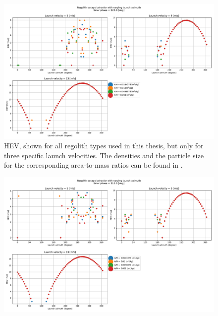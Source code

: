 \documentclass[print]{tudelft-report}
\begin{document}
\begin{appendices}
\begin{figure}[htb]
    \label{fig:longestEdge_allParticles_escape_hev_solarPhase135}
    \end{figure}
    \FloatBarrier
    \begin{figure}[htb]
    \centering
    \captionsetup{justification=centering}
    \includegraphics[width=\textwidth, height=0.5\textheight, keepaspectratio=true]{Results/Images/longest_edge_perturbations/multiple_regolith_types/phase225_escapeHEV.pdf}
    \caption{\gls{HEV}, shown for all regolith types used in this thesis, but only for three specific launch velocities. The densities and the particle size for the corresponding area-to-mass ratios can be found in .}
    \label{fig:longestEdge_allParticles_escape_hev_solarPhase225}
    \end{figure}
    \FloatBarrier
    \begin{figure}[htb]
    \centering
    \captionsetup{justification=centering}
    \includegraphics[width=\textwidth, height=0.5\textheight, keepaspectratio=true]{Results/Images/longest_edge_perturbations/multiple_regolith_types/phase315_escapeHEV.pdf}

\end{figure}
\end{appendices}
\end{document}
